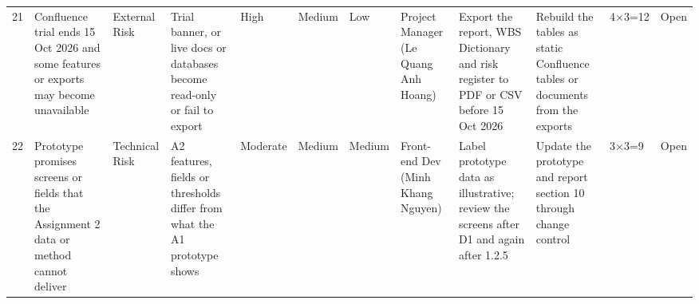 \begin{landscape}
{\begin{xltabular}{\linewidth}{@{}L{0.65cm} Z L{1.85cm} Z L{1.45cm} L{1.3cm} L{1.6cm} L{2.0cm} Z Z L{1.25cm} L{1.4cm}@{}}
21 & Confluence trial ends 15 Oct 2026 and some features or exports may become unavailable & External Risk & Trial banner, or live docs or databases become read-only or fail to export & High & Medium & Low & Project Manager (Le Quang Anh Hoang) & Export the report, WBS Dictionary and risk register to PDF or CSV before 15 Oct 2026 & Rebuild the tables as static Confluence tables or documents from the exports & 4×3=12 & Open \\
22 & Prototype promises screens or fields that the Assignment 2 data or method cannot deliver & Technical Risk & A2 features, fields or thresholds differ from what the A1 prototype shows & Moderate & Medium & Medium & Front-end Dev (Minh Khang Nguyen) & Label prototype data as illustrative; review the screens after D1 and again after 1.2.5 & Update the prototype and report section 10 through change control & 3×3=9 & Open \\
\end{xltabular}
}
\end{landscape}
